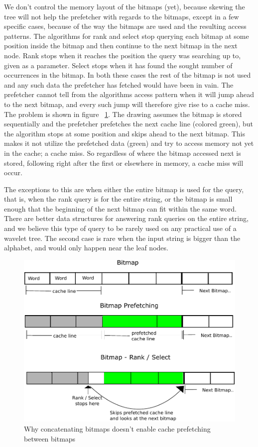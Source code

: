 We don't control the memory layout of the bitmaps (yet), because skewing the tree will not help the prefetcher with regards to the bitmaps, except in a few specific cases, because of the way the bitmaps are used and the resulting access patterns.
The algorithms for rank and select stop querying each bitmap at some position inside the bitmap and then continue to the next bitmap in the next node.
Rank stops when it reaches the position the query was searching up to, given as a parameter.
Select stops when it has found the sought number of occurrences in the bitmap.
In both these cases the rest of the bitmap is not used and any such data the prefetcher has fetched would have been in vain.
The prefetcher cannot tell from the algorithms access pattern when it will jump ahead to the next bitmap, and every such jump will therefore give rise to a cache miss.
The problem is shown in figure ~\ref{fig:QueryPrefetchFigure}. The drawing assumes the bitmap is stored sequentially and the prefetcher prefetches the next cache line (colored green), but the algorithm stops at some position and skips ahead to the next bitmap. This makes it not utilize the prefetched data (green) and try to access memory not yet in the cache; a cache miss.
So regardless of where the bitmap accessed next is stored, following right after the first or elsewhere in memory, a cache miss will occur.

The exceptions to this are when either the entire bitmap is used for the query, that is, when the rank query is for the entire string, or the bitmap is small enough that the beginning of the next bitmap can fit within the same word.
There are better data structures for answering rank queries on the entire string, and we believe this type of query to be rarely used on any practical use of a wavelet tree.
The second case is rare when the input string is bigger than the alphabet, and would only happen near the leaf nodes.

\begin{figure}[h]
\caption{Why concatenating bitmaps doesn't enable cache prefetching between bitmaps}
\label{fig:QueryPrefetchFigure}
\includegraphics[width=\textwidth]{QueryPrefetchFigure.pdf}
\end{figure}



